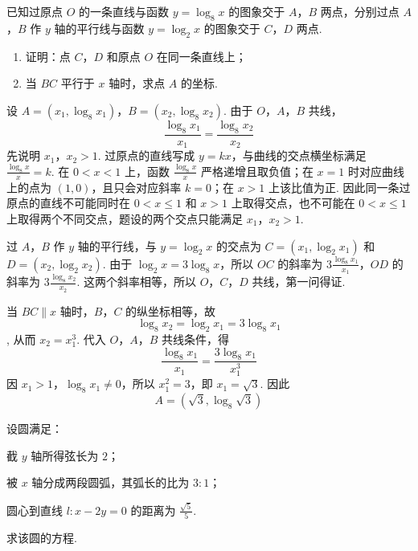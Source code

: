 \documentclass[UTF8,a4paper,oneside,11pt]{ctexbook}
\begin{document}
\begin{problem}
已知过原点 \(O\) 的一条直线与函数 \(y = \log_{8} x\) 的图象交于 \(A\)，\(B\) 两点，分别过点 \(A\)，\(B\) 作 \(y\) 轴的平行线与函数 \(y = \log_{2} x\) 的图象交于 \(C\)，\(D\) 两点.

\begin{enumerate}
\item 证明：点 \(C\)，\(D\) 和原点 \(O\) 在同一条直线上；
\item 当 \(BC\) 平行于 \(x\) 轴时，求点 \(A\) 的坐标.
\end{enumerate}
\end{problem}

\begin{solution}
设 \(A=(x_1,\log_8x_1)\)，\(B=(x_2,\log_8x_2)\). 由于 \(O\)，\(A\)，\(B\) 共线，
\[
\frac{\log_8x_1}{x_1}=\frac{\log_8x_2}{x_2}
\]
先说明 \(x_1\)，\(x_2>1\). 过原点的直线写成 \(y=kx\)，与曲线的交点横坐标满足 \(\frac{\log_8x}{x}=k\). 在 \(0<x<1\) 上，函数 \(\frac{\log_8x}{x}\) 严格递增且取负值；在 \(x=1\) 时对应曲线上的点为 \((1,0)\)，且只会对应斜率 \(k=0\)；在 \(x>1\) 上该比值为正. 因此同一条过原点的直线不可能同时在 \(0<x\leqslant1\) 和 \(x>1\) 上取得交点，也不可能在 \(0<x\leqslant1\) 上取得两个不同交点，题设的两个交点只能满足 \(x_1\)，\(x_2>1\).

过 \(A\)，\(B\) 作 \(y\) 轴的平行线，与 \(y=\log_2x\) 的交点为 \(C=(x_1,\log_2x_1)\) 和 \(D=(x_2,\log_2x_2)\). 由于 \(\log_2x=3\log_8x\)，所以 \(OC\) 的斜率为 \(3\frac{\log_8x_1}{x_1}\)，\(OD\) 的斜率为 \(3\frac{\log_8x_2}{x_2}\).
这两个斜率相等，所以 \(O\)，\(C\)，\(D\) 共线，第一问得证.

当 \(BC\parallel x\) 轴时，\(B\)，\(C\) 的纵坐标相等，故
\[
\log_8x_2=\log_2x_1=3\log_8x_1
\],
从而 \(x_2=x_1^3\). 代入 \(O\)，\(A\)，\(B\) 共线条件，得
\[
\frac{\log_8x_1}{x_1}
=\frac{3\log_8x_1}{x_1^3}
\]
因 \(x_1>1\)，\(\log_8x_1\ne0\)，所以 \(x_1^2=3\)，即 \(x_1=\sqrt3\). 因此
\[
A=\left(\sqrt3,\log_8\sqrt3\right)
\]
\end{solution}

\begin{problem}
设圆满足：
\begin{circlelist}
\item 截 \(y\) 轴所得弦长为 \(2\)；
\item 被 \(x\) 轴分成两段圆弧，其弧长的比为 \(3:1\)；
\item 圆心到直线 \(l: x - 2y = 0\) 的距离为 \(\frac{\sqrt{5}}{5}\).
\end{circlelist}
求该圆的方程.
\end{problem}
\end{document}
